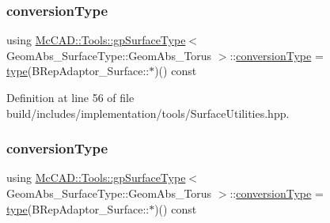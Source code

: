 \subsubsection{\texorpdfstring{conversion\+Type}{conversionType}\hspace{0.1cm}{\footnotesize\ttfamily [1/2]}}
{\footnotesize\ttfamily using \hyperlink{structMcCAD_1_1Tools_1_1gpSurfaceType}{Mc\+C\+A\+D\+::\+Tools\+::gp\+Surface\+Type}$<$ Geom\+Abs\+\_\+\+Surface\+Type\+::\+Geom\+Abs\+\_\+\+Torus $>$\+::\hyperlink{structMcCAD_1_1Tools_1_1gpSurfaceType_3_01GeomAbs__SurfaceType_1_1GeomAbs__Torus_01_4_ad997fa3fbe5435cad71d40231540a40e}{conversion\+Type} =  \hyperlink{structMcCAD_1_1Tools_1_1gpSurfaceType_3_01GeomAbs__SurfaceType_1_1GeomAbs__Torus_01_4_a462301d1d46d776f21e26368c1e8d1b7}{type}(B\+Rep\+Adaptor\+\_\+\+Surface\+::$\ast$)() const}



Definition at line 56 of file build/includes/implementation/tools/\+Surface\+Utilities.\+hpp.

\mbox{\label{structMcCAD_1_1Tools_1_1gpSurfaceType_3_01GeomAbs__SurfaceType_1_1GeomAbs__Torus_01_4_ad997fa3fbe5435cad71d40231540a40e}} 
\subsubsection{\texorpdfstring{conversion\+Type}{conversionType}\hspace{0.1cm}{\footnotesize\ttfamily [2/2]}}
{\footnotesize\ttfamily using \hyperlink{structMcCAD_1_1Tools_1_1gpSurfaceType}{Mc\+C\+A\+D\+::\+Tools\+::gp\+Surface\+Type}$<$ Geom\+Abs\+\_\+\+Surface\+Type\+::\+Geom\+Abs\+\_\+\+Torus $>$\+::\hyperlink{structMcCAD_1_1Tools_1_1gpSurfaceType_3_01GeomAbs__SurfaceType_1_1GeomAbs__Torus_01_4_ad997fa3fbe5435cad71d40231540a40e}{conversion\+Type} =  \hyperlink{structMcCAD_1_1Tools_1_1gpSurfaceType_3_01GeomAbs__SurfaceType_1_1GeomAbs__Torus_01_4_a462301d1d46d776f21e26368c1e8d1b7}{type}(B\+Rep\+Adaptor\+\_\+\+Surface\+::$\ast$)() const}




